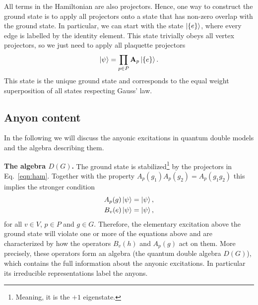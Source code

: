\documentclass[two column]{article}
\begin{document}


All terms in the Hamiltonian are also projectors. Hence, one way to construct the ground state is to apply all projectors onto a state that has non-zero overlap with the ground state. In particular, we can start with the state $\ket{\{e\}}$, where every edge is labelled by the identity element.
This state trivially obeys all vertex projectors, so we just need to apply all plaquette projectors
\begin{equation}
    \ket{\psi} = \prod_{p \in P} \mathbf A_p \ket{\{e\}}.
\end{equation}
This state is the unique ground state and corresponds to the equal weight superposition of all states respecting Gauss' law.




\subsection{Anyon content}\label{sec:anyon}
In the following we will discuss the anyonic excitations in quantum double models and the algebra describing them.

\textbf{The algebra $D(G)$.} The ground state is stabilized\footnote{Meaning, it is the $+1$ eigenstate.} by the projectors in Eq.~\eqref{eqn:ham}. Together with the property $A_p{(g_1)}A_p{(g_2)} = A_p{(g_1 g_2)}$ this implies the stronger condition
\begin{equation}
\begin{split}
    A_p{(g)} \ket{\psi} = \ket{\psi},\\
    B_v{(e)} \ket{\psi} = \ket{\psi},
\end{split}\label{eqn:ground_state}
\end{equation}
for all $v \in V$, $p \in P$ and $g \in G$. Therefore, the elementary excitation above the ground state will violate one or more of the equations above and are characterized by how the operators $B_v(h)$ and $A_p(g)$ act on them. More precisely, these operators form an algebra\cite{cui2018topological, Kitaev_2003} (the quantum double algebra $D(G)$), which contains the full information about the anyonic excitations. In particular its irreducible representations label the anyons.
\end{document}
